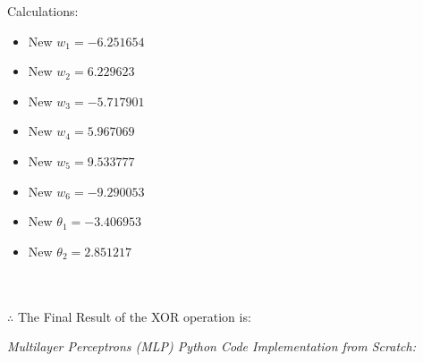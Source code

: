 \documentclass{book}
\begin{document}
Calculations:\\
\begin{itemize}
    \item New \(w_1 = -6.251654\)
    \item New \(w_2 = 6.229623\)
    \item New \(w_3 = -5.717901\)
    \item New \(w_4 = 5.967069\)
    \item New \(w_5 = 9.533777\)
    \item New \(w_6 = -9.290053\)
    \item New \(\theta_1 = -3.406953\)
    \item New \(\theta_2 = 2.851217\)
\end{itemize}
\vspace{5mm}
\\
\\
\vspace{2mm}
$\therefore$ The Final Result of the XOR operation is:
\begin{center}
\end{center}
\newpage
\textit{\large{Multilayer Perceptrons (MLP) Python Code Implementation from Scratch:}}
\end{document}
